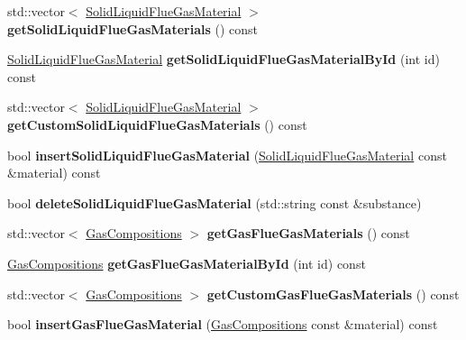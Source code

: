\begin{DoxyCompactItemize}
std\+::vector$<$ \hyperlink{class_solid_liquid_flue_gas_material}{Solid\+Liquid\+Flue\+Gas\+Material} $>$ {\bfseries get\+Solid\+Liquid\+Flue\+Gas\+Materials} () const
\item 
\mbox{\label{class_s_q_lite_aa7ea5aa679227d695fe38848236281ee}} 
\hyperlink{class_solid_liquid_flue_gas_material}{Solid\+Liquid\+Flue\+Gas\+Material} {\bfseries get\+Solid\+Liquid\+Flue\+Gas\+Material\+By\+Id} (int id) const
\item 
\mbox{\label{class_s_q_lite_a23b34dae2fa12690d3718755fc373b42}} 
std\+::vector$<$ \hyperlink{class_solid_liquid_flue_gas_material}{Solid\+Liquid\+Flue\+Gas\+Material} $>$ {\bfseries get\+Custom\+Solid\+Liquid\+Flue\+Gas\+Materials} () const
\item 
\mbox{\label{class_s_q_lite_aa1de7450c37a07dfd0541fdf0dc164ef}} 
bool {\bfseries insert\+Solid\+Liquid\+Flue\+Gas\+Material} (\hyperlink{class_solid_liquid_flue_gas_material}{Solid\+Liquid\+Flue\+Gas\+Material} const \&material) const
\item 
\mbox{\label{class_s_q_lite_a56fb2567626738b5d702a73617bb28d0}} 
bool {\bfseries delete\+Solid\+Liquid\+Flue\+Gas\+Material} (std\+::string const \&substance)
\item 
\mbox{\label{class_s_q_lite_a7f054c9a3a3954277c5de8d4048a40f9}} 
std\+::vector$<$ \hyperlink{class_gas_compositions}{Gas\+Compositions} $>$ {\bfseries get\+Gas\+Flue\+Gas\+Materials} () const
\item 
\mbox{\label{class_s_q_lite_a230049a94b9e2ff84d19fcd5a087954c}} 
\hyperlink{class_gas_compositions}{Gas\+Compositions} {\bfseries get\+Gas\+Flue\+Gas\+Material\+By\+Id} (int id) const
\item 
\mbox{\label{class_s_q_lite_a8cd9d62714f1083bab16e388dabc59be}} 
std\+::vector$<$ \hyperlink{class_gas_compositions}{Gas\+Compositions} $>$ {\bfseries get\+Custom\+Gas\+Flue\+Gas\+Materials} () const
\item 
\mbox{\label{class_s_q_lite_a95d5521ed0de19c979ac9627ae21fbcd}} 
bool {\bfseries insert\+Gas\+Flue\+Gas\+Material} (\hyperlink{class_gas_compositions}{Gas\+Compositions} const \&material) const

\end{DoxyCompactItemize}

